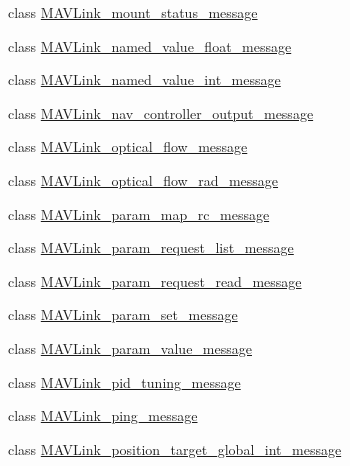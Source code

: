 \begin{DoxyCompactItemize}
\item 
class \hyperlink{classpymavlink_1_1dialects_1_1v10_1_1MAVLink__mount__status__message}{M\+A\+V\+Link\+\_\+mount\+\_\+status\+\_\+message}
\item 
class \hyperlink{classpymavlink_1_1dialects_1_1v10_1_1MAVLink__named__value__float__message}{M\+A\+V\+Link\+\_\+named\+\_\+value\+\_\+float\+\_\+message}
\item 
class \hyperlink{classpymavlink_1_1dialects_1_1v10_1_1MAVLink__named__value__int__message}{M\+A\+V\+Link\+\_\+named\+\_\+value\+\_\+int\+\_\+message}
\item 
class \hyperlink{classpymavlink_1_1dialects_1_1v10_1_1MAVLink__nav__controller__output__message}{M\+A\+V\+Link\+\_\+nav\+\_\+controller\+\_\+output\+\_\+message}
\item 
class \hyperlink{classpymavlink_1_1dialects_1_1v10_1_1MAVLink__optical__flow__message}{M\+A\+V\+Link\+\_\+optical\+\_\+flow\+\_\+message}
\item 
class \hyperlink{classpymavlink_1_1dialects_1_1v10_1_1MAVLink__optical__flow__rad__message}{M\+A\+V\+Link\+\_\+optical\+\_\+flow\+\_\+rad\+\_\+message}
\item 
class \hyperlink{classpymavlink_1_1dialects_1_1v10_1_1MAVLink__param__map__rc__message}{M\+A\+V\+Link\+\_\+param\+\_\+map\+\_\+rc\+\_\+message}
\item 
class \hyperlink{classpymavlink_1_1dialects_1_1v10_1_1MAVLink__param__request__list__message}{M\+A\+V\+Link\+\_\+param\+\_\+request\+\_\+list\+\_\+message}
\item 
class \hyperlink{classpymavlink_1_1dialects_1_1v10_1_1MAVLink__param__request__read__message}{M\+A\+V\+Link\+\_\+param\+\_\+request\+\_\+read\+\_\+message}
\item 
class \hyperlink{classpymavlink_1_1dialects_1_1v10_1_1MAVLink__param__set__message}{M\+A\+V\+Link\+\_\+param\+\_\+set\+\_\+message}
\item 
class \hyperlink{classpymavlink_1_1dialects_1_1v10_1_1MAVLink__param__value__message}{M\+A\+V\+Link\+\_\+param\+\_\+value\+\_\+message}
\item 
class \hyperlink{classpymavlink_1_1dialects_1_1v10_1_1MAVLink__pid__tuning__message}{M\+A\+V\+Link\+\_\+pid\+\_\+tuning\+\_\+message}
\item 
class \hyperlink{classpymavlink_1_1dialects_1_1v10_1_1MAVLink__ping__message}{M\+A\+V\+Link\+\_\+ping\+\_\+message}
\item 
class \hyperlink{classpymavlink_1_1dialects_1_1v10_1_1MAVLink__position__target__global__int__message}{M\+A\+V\+Link\+\_\+position\+\_\+target\+\_\+global\+\_\+int\+\_\+message}

\end{DoxyCompactItemize}
